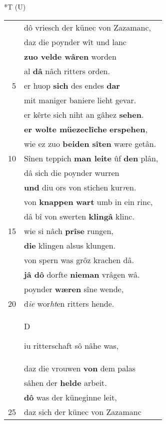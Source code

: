 \documentclass[8pt,a4paper,notitlepage]{article}
\begin{document}
\begin{table}[ht]
\begin{minipage}[t]{0.5\linewidth}
\end{minipage}
\hspace{0.5cm}
\begin{minipage}[t]{0.5\linewidth}
\small
\begin{center}*T (U)
\end{center}
\begin{tabular}{rl}
 & dô vriesch der künec von Zazamanc,\\ 
 & daz die poynder wît und lanc\\ 
 & \textbf{zuo velde wâren} worden\\ 
 & al \textbf{dâ} nâch ritters orden.\\ 
5 & er huop \textbf{sich} des endes \textbf{dar}\\ 
 & mit maniger baniere lieht gevar.\\ 
 & er kêrte sich niht an gâhez \textbf{sehen}.\\ 
 & \textbf{er wolte müezeclîche} \textbf{erspehen},\\ 
 & wie ez zuo \textbf{beiden sîten} wære getân.\\ 
10 & Sînen teppich \textbf{man leite} ûf \textbf{den} plân,\\ 
 & dâ sich die poynder wurren\\ 
 & \textbf{und} diu ors von stichen kur\textit{r}en.\\ 
 & von \textbf{knappen} \textbf{wart} umb in ein rinc,\\ 
 & dâ bî von swerten \textbf{klingâ} klinc.\\ 
15 & wie si nâch \textbf{prîse} rungen,\\ 
 & \textbf{die} klingen alsus klungen.\\ 
 & von spern was grôz krachen dâ.\\ 
 & \textbf{jâ dô} dorfte \textbf{nieman} vrâgen wâ.\\ 
 & poynder \textbf{wæren} sîne wende,\\ 
20 & d\textit{ie} wor\textit{ht}en ritters hende.\\ 
 & \begin{large}D\end{large}iu ritterschaft sô nâhe was,\\ 
 & daz die vrouwen \textbf{von} dem palas\\ 
 & sâhen der \textbf{helde} arbeit.\\ 
 & \textbf{dô} was der küneginne leit,\\ 
25 & daz sich der künec von Zazamanc\\ 

\end{tabular}
\end{minipage}
\end{table}
\end{document}
